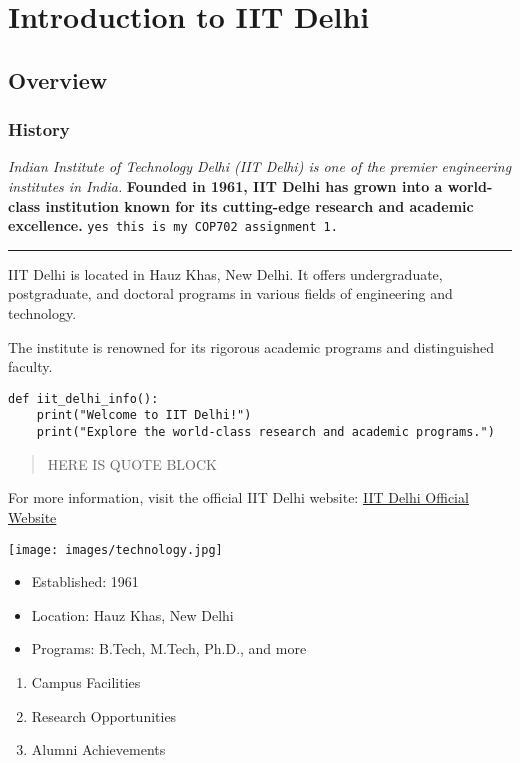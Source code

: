 

\section{Introduction to IIT Delhi}
\subsection{Overview}
\subsubsection{History}

\textit{Indian Institute of Technology Delhi (IIT Delhi) is one of the premier engineering institutes in India.}
\textbf{Founded in 1961, IIT Delhi has grown into a world-class institution known for its cutting-edge research and academic excellence.}
\texttt{yes this is my COP702 assignment 1.}
\hrule

IIT Delhi is located in Hauz Khas, New Delhi. It offers undergraduate, postgraduate, and doctoral programs in various fields of engineering and technology.\par
The institute is renowned for its rigorous academic programs and distinguished faculty.

\begin{verbatim}
def iit_delhi_info():
    print("Welcome to IIT Delhi!")
    print("Explore the world-class research and academic programs.")
\end{verbatim}

\begin{quote}
    HERE IS QUOTE BLOCK
\end{quote}

For more information, visit the official IIT Delhi website: \href{https://www.iitd.ac.in}{IIT Delhi Official Website}

\texttt{[image: images/technology.jpg]}

\begin{itemize}
    \item Established: 1961
    \item Location: Hauz Khas, New Delhi
    \item Programs: B.Tech, M.Tech, Ph.D., and more
\end{itemize}


\begin{enumerate}
    \item Campus Facilities
    \item Research Opportunities
    \item Alumni Achievements
\end{enumerate}

